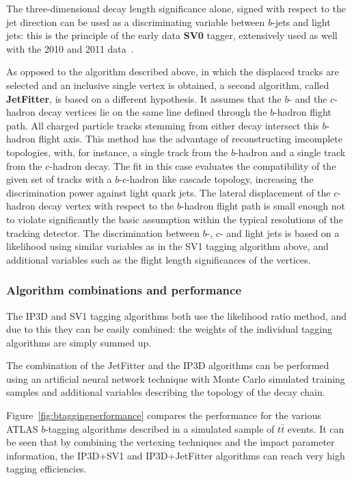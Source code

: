 The three-dimensional decay length significance alone,  signed with respect to the jet direction can be used as a discriminating variable between $b$-jets and light jets: this is the principle of the early data \textbf{SV0} tagger, extensively used as well with the 2010 and 2011 data~\cite{ATLAS-CONF-2010-042}.


As opposed to the algorithm described above, in which the displaced tracks are selected and an inclusive single vertex is obtained, a second algorithm, called \textbf{JetFitter}, is based on a different hypothesis. It assumes that the $b$- and the $c$-hadron decay vertices lie on the same line defined through the $b$-hadron flight path. All charged particle tracks stemming from either decay intersect this $b$-hadron flight axis. This method has the advantage of reconstructing imcomplete topologies, with, for instance, a single track from the $b$-hadron and a single track from the $c$-hadron decay. The fit in this case evaluates the compatibility of the given set of tracks with a $b$-$c$-hadron like cascade topology, increasing the discrimination power against light quark jets.
The lateral displacement of the $c$-hadron decay vertex with respect to the $b$-hadron flight path is small enough not to violate significantly the basic assumption within the typical resolutions of the tracking detector.
The discrimination between $b$-, $c$- and light jets is based on a likelihood using similar variables as in the SV1 tagging algorithm above, and additional
variables such as the flight length significances of the vertices.

\subsubsection{Algorithm combinations and performance}

The IP3D and SV1 tagging algorithms both use the likelihood ratio method, and due to this they can be easily combined: the weights of the individual tagging algorithms are simply summed up. 

The combination of the JetFitter and the IP3D algorithms can be performed using an artificial neural network technique with Monte Carlo simulated training samples and additional variables describing the topology of the decay chain. 

Figure~\ref{fig:btaggingperformance} compares the performance for the various ATLAS $b$-tagging algorithms described in a simulated sample of $t\bar{t}$ events.
It can be seen that by combining the vertexing techniques and the impact parameter information, the IP3D+SV1 and IP3D+JetFitter algorithms can reach very high tagging efficiencies.

